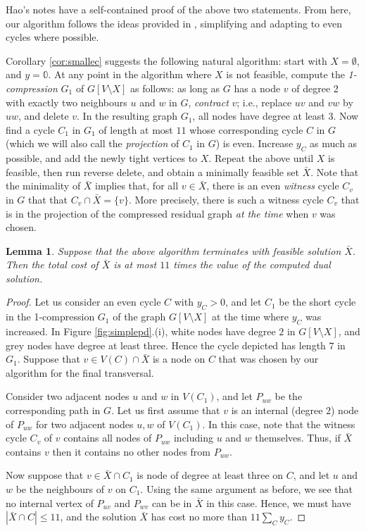 \documentclass{article}
\newcommand{\0}{\mathbb{0}}
\newcommand{\1}{\mathbb{1}}
\newtheorem{lemma}[theorem]{Lemma}
\begin{document}
Hao's notes have a self-contained proof of the above two statements.
From here, our algorithm follows the ideas provided in \cite{FJP10},
simplifying and adapting to even cycles where possible. 

Corollary \ref{cor:smallec} suggests the following natural algorithm:
start with $X=\emptyset$, and $y=\0$. At any point in the algorithm
where $X$ is not feasible, compute the {\em 1-compression} $G_1$ of
$G[V\setminus X]$ as follows: as long as $G$ has a node $v$ of degree 2 with
exactly two neighbours $u$ and $w$ in $G$, {\em contract} $v$; i.e.,
replace $uv$ and $vw$ by $uw$, and delete $v$. In the resulting graph
$G_1$, all nodes have degree at least $3$. Now find a cycle $C_1$ in
$G_1$ of length at most $11$ whose corresponding cycle $C$ in $G$
(which we will also call the {\em projection} of $C_1$ in $G$)
is
even. Increase $y_C$ as much as possible, and add the newly tight
vertices to $X$. Repeat the above until $X$ is feasible, then run
reverse delete, and obtain a minimally feasible set $\bar{X}$. Note
that the minimality of $\bar{X}$ implies that, for all
$v \in \bar{X}$, there is an even {\em witness} cycle $C_v$ in $G$
that that $C_v \cap \bar{X} = \{v\}$. More precisely,  there is such a
witness cycle $C_v$ that is in the projection of  the compressed
residual graph {\em at the time} when $v$ was chosen. 

\begin{lemma} \label{lem:simplealg}
  Suppose that the above algorithm terminates with
  feasible solution $\bar{X}$. Then the total cost of $\bar{X}$ is at
  most $11$ times the value of the computed dual solution.
\end{lemma}
\begin{proof}
  Let us consider an even cycle $C$ with $y_C>0$, and let $C_1$ be the
  short cycle in the 1-compression $G_1$ of the graph $G[V\setminus
  X]$ at the time where $y_C$ was increased. 
  In Figure
  \ref{fig:simplepd}.(i), white nodes have degree $2$ in $G[V\setminus
  X]$, and grey nodes have degree at least three. Hence the cycle
  depicted has length $7$ in $G_1$. Suppose that $v \in V(C) \cap
  \bar{X}$ is a node on $C$ that was chosen by our algorithm for the
  final transversal.

  Consider two adjacent nodes $u$ and $w$ in $V(C_1)$, and let
  $P_{uw}$ be the corresponding path in $G$. 
  Let us first assume that $v$ is an internal (degree $2$) node of
  $P_{uw}$ for two adjacent nodes $u,w$ of $V(C_1)$. In this case,
  note that the witness cycle $C_v$ of $v$ contains all nodes of
  $P_{uw}$ including $u$ and $w$ themselves. Thus, if $\bar{X}$
  contains $v$ then it contains no other nodes from $P_{uw}$.

  Now suppose that $v \in \bar{X} \cap C_1$ is node of
  degree at least three on $C$, and let $u$ and $w$ be the neighbours
  of $v$ on $C_1$. Using the same argument as before, we see that
  no internal vertex of $P_{uv}$ and $P_{wv}$ can be in $\bar{X}$ in
  this case. Hence, we must have
  $|\bar{X} \cap C| \leq 11$, and the solution
  $\bar{X}$ has cost no more than $11\sum_Cy_C$. 
\end{proof}
\end{document}
